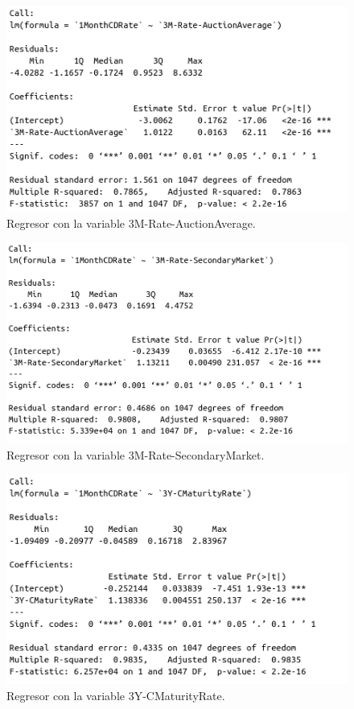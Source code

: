 \documentclass[12pt,a4paper]{article}
\begin{document}
\begin{figure}[H]
	\centering 
	\includegraphics[scale=0.55]{./Imagenes/Regresion/regresor_1va3.png}
	\caption{Regresor con la variable 3M-Rate-AuctionAverage.}
\end{figure}

\begin{figure}[H]
	\centering 
	\includegraphics[scale=0.55]{./Imagenes/Regresion/regresor_1va4.png}
	\caption{Regresor con la variable 3M-Rate-SecondaryMarket.}
\end{figure}

\begin{figure}[H]
	\centering 
	\includegraphics[scale=0.55]{./Imagenes/Regresion/regresor_1va5.png}
	\caption{Regresor con la variable 3Y-CMaturityRate.}
\end{figure}
\end{document}
